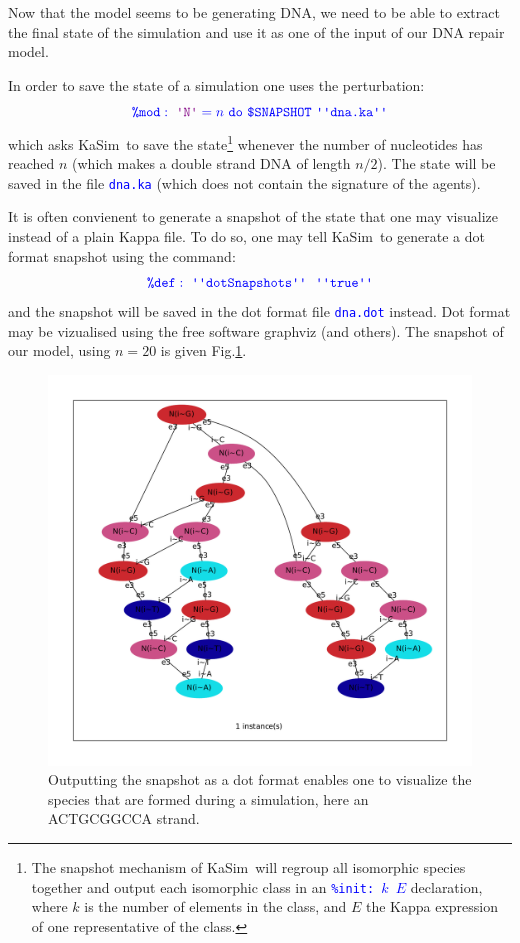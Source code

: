 \documentclass[11pt]{article}
\def\ks{{\sc KaSim}}
\def\ttt#1{\texttt{\textcolor{blue}{#1}}}
\def\mtt#1{{\tt{\color{blue} #1}}}
\def\lab#1{\hbox{\ttt{\color{Plum}\textquotesingle #1\textquotesingle}}}
\def\mod{\hbox{\tt\$}}
\def\Kadec#1#2{\color{blue}\mtt{\hbox{\color{blue}\tt\%}#1:\ #2}}
\def\Kfile#1{\hbox{\ttt{\textquotesingle\textquotesingle #1\textquotesingle\textquotesingle}}}
\begin{document}
Now that the model seems to be generating DNA, we need to be able to extract the final state of the simulation and use it as one of the input of our DNA repair model.

In order to save the state of a simulation one uses the perturbation:
$$
\Kadec{mod}{\lab{N}=\hbox{$n$}\ do\ \mod{SNAPSHOT}\ \Kfile{dna.ka}}
$$
which asks \ks~to save the state\footnote{The snapshot mechanism of \ks~will regroup all isomorphic species together and output each isomorphic class in an \ttt{\%init: $k$ $E$} declaration, where $k$ is the number of elements in the class, and $E$ the Kappa expression of one representative of the class.} whenever the number of nucleotides has reached $n$ (which makes a double strand DNA of length $n/2$). The state will be saved in the file \ttt{dna.ka} (which does not contain the signature of the agents). 

It is often convienent to generate a snapshot of the state that one may visualize instead of a plain Kappa file. To do so, one may tell \ks~to generate a dot format snapshot using the command:
$$
\Kadec{def}{\Kfile{dotSnapshots}\ \ \Kfile{true}}
$$
and the snapshot will be saved in the dot format file \ttt{dna.dot} instead. Dot format may be vizualised using the free software graphviz (and others). The snapshot of our model, using $n=20$ is given Fig.\ref{fig:snapshot}. 

%
\begin{figure}[htbp]
\begin{center}
\includegraphics[scale=0.45]{snapshot.pdf}
\caption{Outputting the snapshot as a dot format enables one to visualize the species that are formed during a simulation, here an ACTGCGGCCA strand.}\label{fig:snapshot}
\end{center}
\end{figure}
\end{document}
